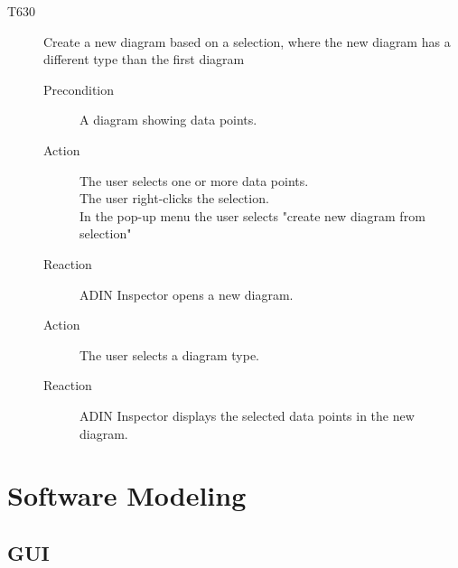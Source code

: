 \documentclass[twoside, english, draft]{Pflichtenheft}
\begin{document}
\begin{description}
	\item[T630] Create a new diagram based on a selection, where the new diagram has a different type than the first diagram
	      \begin{description}
		      \item[Precondition]
		            A diagram showing data points.
		      \item[Action]
		            The user selects one or more data points. \\
		            The user right-clicks the selection. \\
		            In the pop-up menu the user selects "create new diagram from selection"

		      \item[Reaction]
		            ADIN Inspector opens a new diagram.
		      \item[Action]
		            The user selects a diagram type.
		      \item[Reaction]
		            ADIN Inspector displays the selected data points in the new diagram.
	      \end{description}


\end{description}

\section{Software Modeling}



\subsection{GUI}

\end{document}
